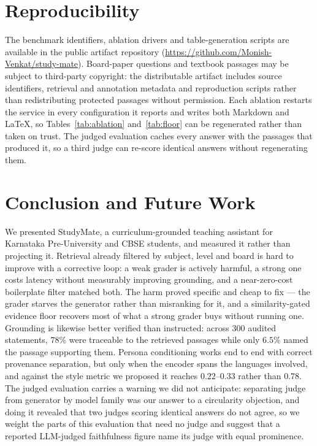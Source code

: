 \documentclass[conference]{IEEEtran}
\begin{document}
\section{Reproducibility}
\label{sec:repro}
The benchmark identifiers, ablation drivers and table-generation scripts are
available in the public artifact repository
(\url{https://github.com/Monish-Venkat/study-mate}). Board-paper questions and
textbook passages may be subject to third-party copyright: the distributable
artifact includes source identifiers, retrieval and annotation metadata and
reproduction scripts rather than redistributing protected passages without
permission. Each ablation restarts the service in every configuration it reports
and writes both Markdown and \LaTeX{}, so Tables~\ref{tab:ablation}
and~\ref{tab:floor} can be regenerated rather than taken on trust. The judged
evaluation caches every answer with the passages that produced it, so a third
judge can re-score identical answers without regenerating them.

\section{Conclusion and Future Work}
\label{sec:future}
We presented StudyMate, a curriculum-grounded teaching assistant for Karnataka
Pre-University and CBSE students, and measured it rather than projecting it.
Retrieval already filtered by subject, level and board is hard to improve with a
corrective loop: a weak grader is actively harmful, a strong one costs latency
without measurably improving grounding, and a near-zero-cost boilerplate filter
matched both. The harm proved specific and cheap to fix --- the grader starves
the generator rather than misranking for it, and a similarity-gated evidence
floor recovers most of what a strong grader buys without running one. Grounding
is likewise better verified than instructed: across $300$ audited statements,
$78\%$ were traceable to the retrieved passages while only $6.5\%$ named the
passage supporting them. Persona conditioning works end to end with correct
provenance separation, but only when the encoder spans the languages involved,
and against the style metric we proposed it reaches $0.22$--$0.33$ rather than
$0.78$. The judged evaluation carries a warning we did not anticipate:
separating judge from generator by model family was our answer to a circularity
objection, and doing it revealed that two judges scoring identical answers do
not agree, so we weight the parts of this evaluation that need no judge and
suggest that a reported LLM-judged faithfulness figure name its judge with equal
prominence.
\end{document}
